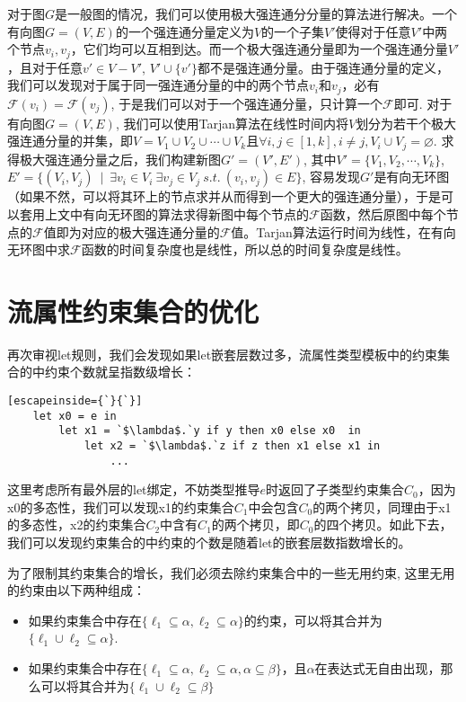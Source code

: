\documentclass[UTF8, colorlinks]{pkuthss}
\let\emptyset\varnothing
\begin{document}
	对于图$G$是一般图的情况，我们可以使用极大强连通分分量的算法进行解决\cite{tarjan}。一个有向图$G = (V, E)$的一个强连通分量定义为$V$的一个子集$V'$使得对于任意$V'$中两个节点$v_i, v_j$，它们均可以互相到达。而一个极大强连通分量即为一个强连通分量$V'$，且对于任意$v'\in V - V'$, $V'\cup\{v'\}$都不是强连通分量。由于强连通分量的定义，我们可以发现对于属于同一强连通分量的中的两个节点$v_i$和$v_j$，必有$\mathcal{F}(v_i) = \mathcal{F}(v_j)$, 于是我们可以对于一个强连通分量，只计算一个$\mathcal{F}$即可. 对于有向图$G = (V, E)$, 我们可以使用Tarjan算法在线性时间内将$V$划分为若干个极大强连通分量的并集，即$V = V_1\cup V_2\cup \cdots\cup V_k$且$\forall i, j \in [1, k], i \not= j, V_i\cup V_j = \emptyset$. 求得极大强连通分量之后，我们构建新图$G' = (V', E')$, 其中$V' = \{V_1, V_2, \cdots, V_k\}$, $E' =  \{(V_i, V_j)\ \mid\ \exists v_i\in V_i\ \exists v_j\in V_j\ s.t.\ (v_i, v_j)\in E\}$, 容易发现$G'$是有向无环图（如果不然，可以将其环上的节点求并从而得到一个更大的强连通分量），于是可以套用上文中有向无环图的算法求得新图中每个节点的$\mathcal{F}$函数，然后原图中每个节点的$\mathcal{F}$值即为对应的极大强连通分量的$\mathcal{F}$值。Tarjan算法运行时间为线性，在有向无环图中求$\mathcal{F}$函数的时间复杂度也是线性，所以总的时间复杂度是线性。
	
	\section{流属性约束集合的优化}
	再次审视let规则，我们会发现如果let嵌套层数过多，流属性类型模板中的约束集合的中约束个数就呈指数级增长：
	\begin{lstlisting}[escapeinside={`}{`}]
	let x0 = e in
		let x1 = `$\lambda$.`y if y then x0 else x0  in
			let x2 = `$\lambda$.`z if z then x1 else x1 in
				...
	\end{lstlisting}
	这里考虑所有最外层的let绑定，不妨类型推导$e$时返回了子类型约束集合$C_0$，因为x0的多态性，我们可以发现x1的约束集合$C_1$中会包含$C_0$的两个拷贝，同理由于x1的多态性，x2的约束集合$C_2$中含有$C_1$的两个拷贝，即$C_0$的四个拷贝。如此下去，我们可以发现约束集合的中约束的个数是随着let的嵌套层数指数增长的。
	
	为了限制其约束集合的增长，我们必须去除约束集合中的一些无用约束, 这里无用的约束由以下两种组成：
	\begin{itemize}
		\item 如果约束集合中存在$\{\ell_1\subseteq \alpha, \ell_2\subseteq \alpha\}$的约束，可以将其合并为$\{\ell_1\cup\ell_2 \subseteq \alpha\}$. 
		\item 如果约束集合中存在$\{\ell_1 \subseteq \alpha, \ell_2 \subseteq \alpha, \alpha\subseteq \beta\}$，且$\alpha$在表达式无自由出现，那么可以将其合并为$\{\ell_1\cup\ell_2\subseteq\beta\}$
	\end{itemize}
	
\end{document}
